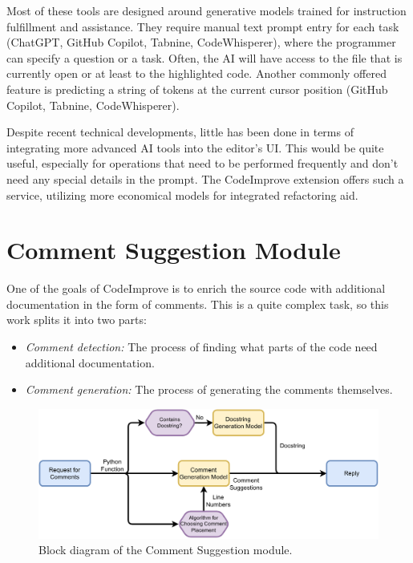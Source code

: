     Most of these tools are designed around generative models trained for instruction fulfillment and assistance. They require manual text prompt entry for each task (ChatGPT, GitHub Copilot, Tabnine, CodeWhisperer), where the programmer can specify a question or a task. Often, the AI will have access to the file that is currently open or at least to the highlighted code. Another commonly offered feature is predicting a string of tokens at the current cursor position (GitHub Copilot, Tabnine, CodeWhisperer).
    
    Despite recent technical developments, little has been done in terms of integrating more advanced AI tools into the editor's UI. This would be quite useful, especially for operations that need to be performed frequently and don't need any special details in the prompt. The CodeImprove extension offers such a service, utilizing more economical models for integrated refactoring aid.

    \section{Comment Suggestion Module} \label{comment_suggestion}
        One of the goals of CodeImprove is to enrich the source code with additional documentation in the form of comments. This is a quite complex task, so this work splits it into two parts:
        \begin{itemize}
            \item \emph{Comment detection:} The process of finding what parts of the code need additional documentation.
            \item \emph{Comment generation:} The process of generating the comments themselves.
        \end{itemize}
    
    
    \begin{figure}[H]
      \centering
      \includegraphics[width=1\textwidth]{obrazky-figures/comment-generation.pdf}
       \caption{Block diagram of the Comment Suggestion module.}
      \label{fig:comment-suggestion-led}
    \end{figure}
    
